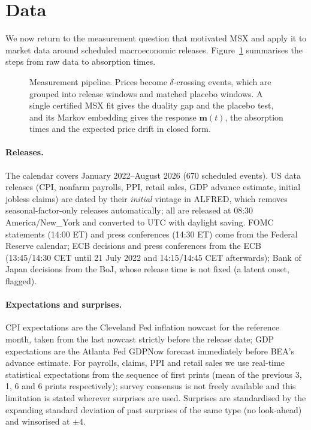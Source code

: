\section{Data}\label{sec:data}

We now return to the measurement question that motivated MSX and apply it to market data around
scheduled macroeconomic releases. Figure~\ref{fig:pipeline} summarises the steps from raw data to
absorption times.

\begin{figure}[!htbp]\centering

\caption{Measurement pipeline. Prices become $\delta$-crossing events, which are grouped into
release windows and matched placebo windows. A single certified MSX fit gives the duality gap and
the placebo test, and its Markov embedding gives the response $\bm m(t)$, the absorption times
and the expected price drift in closed form.}\label{fig:pipeline}
\end{figure}

\paragraph{Releases.}
The calendar covers January 2022--August 2026 (670 scheduled events). US data releases
(CPI, nonfarm payrolls, PPI, retail sales, GDP advance estimate, initial jobless claims)
are dated by their \emph{initial} vintage in ALFRED, which removes seasonal-factor-only
releases automatically; all are released at 08:30 America/New\_York and converted to UTC
with daylight saving. FOMC statements (14:00 ET) and press conferences (14:30 ET) come
from the Federal Reserve calendar; ECB decisions and press conferences from the ECB
(13:45/14:30 CET until 21 July 2022 and 14:15/14:45 CET afterwards); Bank of Japan
decisions from the BoJ, whose release time is not fixed (a latent onset, flagged).

\paragraph{Expectations and surprises.}
CPI expectations are the Cleveland Fed inflation nowcast for the reference month, taken
from the last nowcast strictly before the release date; GDP expectations are the Atlanta
Fed GDPNow forecast immediately before BEA's advance estimate. For payrolls, claims, PPI
and retail sales we use real-time statistical expectations from the sequence of first
prints (mean of the previous 3, 1, 6 and 6 prints respectively); survey consensus is not
freely available and this limitation is stated wherever surprises are used. Surprises
are standardised by the expanding standard deviation of past surprises of the same
type (no look-ahead) and winsorised at $\pm4$.

